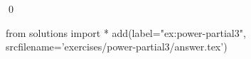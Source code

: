 
\begin{ex} 
  \label{ex:power-partial3}
  
  \qed
\end{ex} 
\begin{python0}
from solutions import *
add(label="ex:power-partial3",
    srcfilename='exercises/power-partial3/answer.tex') 
\end{python0}
